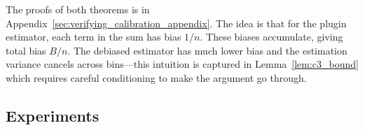 \begin{theorem}
\label{thm:final-ours}
\finalCancelingText{}
\end{theorem}

\newtheorem*{finalCanceling}{Restatement of Theorem~\ref{thm:final-ours}}


The proofs of both theorems is in Appendix~\ref{sec:verifying_calibration_appendix}. The idea is that for the plugin estimator, each term in the sum has bias $1/n$. These biases accumulate, giving total bias $B/n$. The debiased estimator has much lower bias and the estimation variance cancels across bins---this intuition is captured in Lemma~\ref{lem:c3_bound} which requires careful conditioning to make the argument go through.


\newcommand{\calset}[0]{\ensuremath{S_C}}
\newcommand{\verifset}[0]{\ensuremath{S_E}}

\subsection{Experiments}


